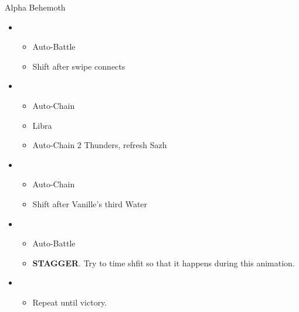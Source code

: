 	\vfill
	

	\begin{battle}[0:40]{Alpha Behemoth}
		\begin{itemize}
			\item \first
			      \begin{itemize}
				      \item Auto-Battle
				      \item Shift after swipe connects
			      \end{itemize}
			\item \second
			      \begin{itemize}
				      \item Auto-Chain
				      \item Libra
				      \item Auto-Chain 2 Thunders, refresh Sazh
			      \end{itemize}
			\item \fourth
			      \begin{itemize}
				      \item Auto-Chain
				      \item Shift after Vanille's third Water
			      \end{itemize}
			\item \first
			      \begin{itemize}
				      \item Auto-Battle
				      \item \textbf{STAGGER}. Try to time shfit so that it happens during this animation.
			      \end{itemize}
			\item \third
			      \begin{itemize}
				      \item Repeat until victory.
			      \end{itemize}
		\end{itemize}
	\end{battle}
	\vfill
	\ 


	 
	

